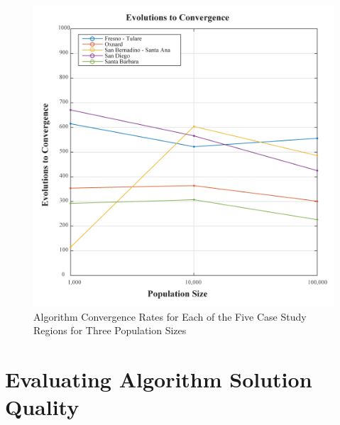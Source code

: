     \begin{figure}[!h]
        \begin{center}
        \includegraphics[width=5.5in]{figures/Evolutions.png}
        \caption{Algorithm Convergence Rates for Each of the Five Case Study Regions for Three Population Sizes}
        \label{fig:Evolutions}
        \end{center}
    \end{figure}

\section{Evaluating Algorithm Solution Quality}

